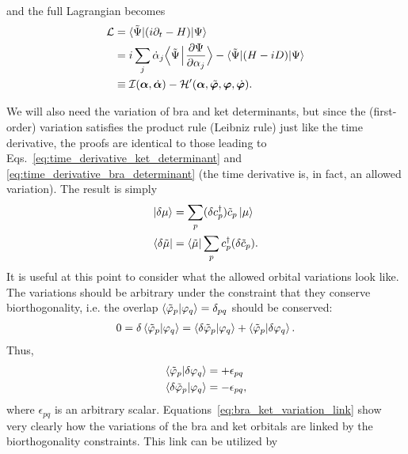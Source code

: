 \documentclass[aip,jcp,preprint,superscriptaddress,nofootinbib]{revtex4-1}
\begin{document}
and the full Lagrangian becomes
\begin{align} \label{eq:Lagrangian_I_and_H_prime}
    \mathcal{L} 
    &= \langle \tilde{\Psi} \vert (i \partial_t - H) \vert \Psi \rangle \nonumber\\ 
    &= i \sum_{j} \dot{\alpha}_j \Big\langle \tilde{\Psi} \mspace{2mu} \Big\vert \mspace{1.5mu} \pdv{\Psi}{\alpha_j} \Big\rangle 
    - \langle \tilde{\Psi} \vert (H - iD) \vert \Psi \rangle \nonumber\\
    &\equiv \mathcal{I} (\bm{\alpha}, \dot{\bm{\alpha}}) - \mathcal{H}'(\bm{\alpha}, \tilde{\bm{\varphi}}, \bm{\varphi}, \dot{\bm{\varphi}}).
\end{align}

We will also need the variation of bra and ket determinants, but since
the (first-order) variation satisfies the product rule (Leibniz rule) just like
the time derivative, the proofs are identical to those leading to 
Eqs.~\eqref{eq:time_derivative_ket_determinant} and \eqref{eq:time_derivative_bra_determinant}
(the time derivative is, in fact,
an allowed variation). The result is simply
\begin{subequations} \label{eq:variation_of_mu_and_mu_tilde}
    \begin{align}
        \ket{\delta \mu}         &= \sum_{p} (\delta c^{\dagger}_{p}) \tilde{c}_{p} \ket{\mu} \\
        \bra{\delta \tilde{\mu}} &= \bra{\tilde{\mu}} \sum_{p} c^{\dagger}_{p} (\delta\tilde{c}_{p}).
    \end{align}
\end{subequations}
It is useful at this point to consider what the allowed
orbital variations look like. The variations should be
arbitrary under the constraint that they
conserve biorthogonality, i.e. the overlap
$\braket{\tilde{\varphi}_{p} | \varphi_{q}} = \delta_{pq}$
should be conserved:
\begin{align}
    0 = \delta \braket{\tilde{\varphi}_{p} | \varphi_{q}} = 
    \braket{\delta\tilde{\varphi}_{p} | \varphi_{q}} + \braket{\tilde{\varphi}_{p} | \delta\varphi_{q}}.
\end{align}
Thus,
\begin{subequations} \label{eq:bra_ket_variation_link}
    \begin{align}
        \braket{\tilde{\varphi}_{p} | \delta\varphi_{q}} &= +\epsilon_{pq} \\
        \braket{\delta\tilde{\varphi}_{p} | \varphi_{q}} &= -\epsilon_{pq},
    \end{align}
\end{subequations}
where $\epsilon_{pq}$ is an arbitrary scalar.
Equations~\eqref{eq:bra_ket_variation_link} show very clearly how the
variations of the bra and ket orbitals are linked by the biorthogonality
constraints.
This link can be utilized by
\end{document}
